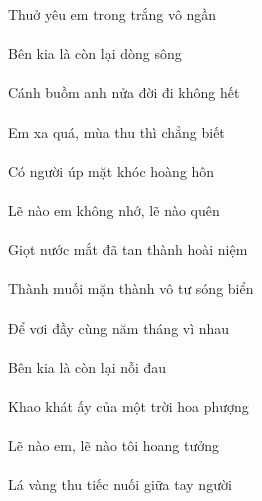 \documentclass[14pt,a4paper]{extarticle}
\begin{document}
\newpage 
Thuở yêu em trong trắng vô ngần\\[1ex]
{\huge {}  \em \Trong {}  }\\[1ex]
Bên kia là còn lại dòng sông\\[1ex]
{\huge {} \kia {}    }\\[1ex]
Cánh buồm anh nửa đời đi không hết\\[1ex]
{\huge {}  \ANH {}    }\\[1ex]
Em xa quá, mùa thu thì chẳng biết\\[1ex]
{\huge \em \xa {}  \thu {}  }\\[1ex]
Có người úp mặt khóc hoàng hôn\\[1ex]
{\huge {}      }\\[1ex]
Lẽ nào em không nhớ, lẽ nào quên\\[1ex]
{\huge {}  \em {}    }\\[1ex]
Giọt nước mắt đã tan thành hoài niệm\\[1ex]
{\huge {}    \tan {}  }\\[1ex]
Thành muối mặn thành vô tư sóng biển\\[1ex]
{\huge {}       }\\[1ex]
Để vơi đầy cùng năm tháng vì nhau\\[1ex]
{\huge {}       \nhau}\\[1ex]
Bên kia là còn lại nỗi đau\\[1ex]
{\huge {} \kia {}    }\\[1ex]
Khao khát ấy của một trời hoa phượng\\[1ex]
{\huge \khao {}     \hoa {}}\\[1ex]
Lẽ nào em, lẽ nào tôi hoang tưởng\\[1ex]
{\huge {}  \em {}   \hoang {}}\\[1ex]
Lá vàng thu tiếc nuối giữa tay người\\[1ex]
{\huge {}  \thu {}   \tay {}}\\[1ex]
\end{document}
